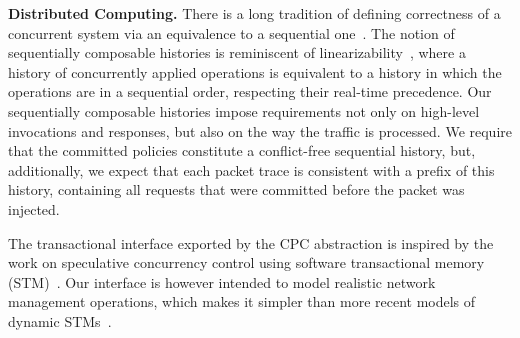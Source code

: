 \documentclass[11pt,pdftex,letter]{article}
\newcommand{\ignore}[1]{}
\begin{document}
\noindent\textbf{Distributed Computing.}
There is a long tradition of defining correctness of a concurrent system via
an equivalence to a sequential one~\cite{Pap79-serial,Lam79,HW90}.  The notion
of sequentially composable histories is reminiscent of
linearizability~\cite{HW90}, where a history of concurrently applied operations
is equivalent to a history in which the
operations are in a sequential order, respecting their real-time precedence.
Our sequentially composable histories impose requirements not
only on high-level invocations and responses, but also on the way the traffic
is processed. We require that the committed policies constitute a
conflict-free sequential history, but, additionally,  we expect that each
packet trace is consistent with a prefix of this history,
containing all requests that were committed before the packet was injected.

The transactional interface exported by the CPC abstraction is inspired by the
work on speculative concurrency control using software transactional memory
(STM)~\cite{stm-st95}.
Our interface is however intended to model realistic network
management operations, which makes it simpler than more recent models of
dynamic STMs~\cite{dstm}.
\ignore{Extending the interface to dynamic policies that adapt their behavior based on
the current network state sounds like a promising research direction.  On the
other hand, our criterion of sequential composability is more complex than
traditional STM correctness properties in that it imposes restrictions not only
on the high-level interface exported to the control plane, but also on the
paths taken by the data-plane packets.}
\end{document}
